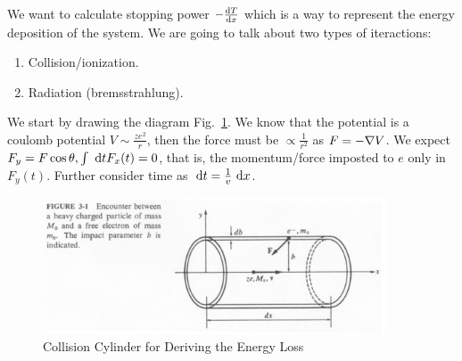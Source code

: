 \documentclass{school-22.101-notes}
\date{December 7, 2011}
\begin{document}
\maketitle

We want to calculate stopping power $- \frac{\mathrm{d}T}{\mathrm{d}x}$ which is a way to represent the energy deposition of the system. We are going to talk about two types of iteractions: 
\begin{enumerate}
  \item Collision/ionization. 
  \item Radiation (bremsstrahlung). 
\end{enumerate}

We start by drawing the diagram Fig.~\ref{cp-collision}. We know that the potential is a coulomb potential $V \sim \frac{ze^2}{r}$, then the force must be $\propto \frac{1}{r^2}$ as $F = - \nabla V$. We expect $F_y = F \cos \theta, \int \mbox{ }\mathrm{d} t F_x(t) = 0$, that is, the momentum/force imposted to $e$ only in $F_y(t)$. Further consider time as $\mbox{ }\mathrm{d} t = \frac{1}{v} \mbox{ }\mathrm{d} x$. 
\begin{figure}[ht]
  \centering
  \includegraphics[width=4in]{images/ni/cp-collision.png}
  \caption{Collision Cylinder for Deriving the Energy Loss} \label{cp-collision}
\end{figure}
\end{document}
